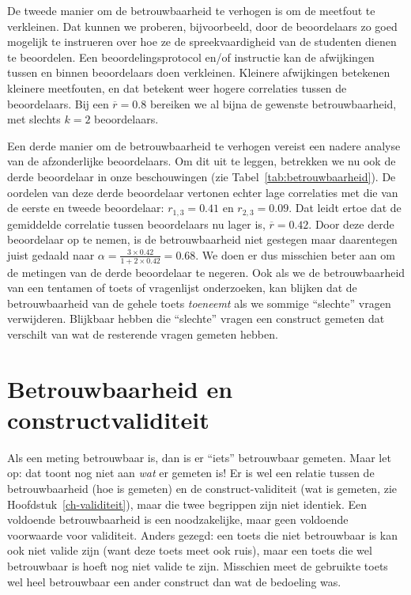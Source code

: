 \documentclass[
]{book}
\begin{document}
De tweede manier om de betrouwbaarheid te verhogen is om de meetfout te
verkleinen. Dat kunnen we proberen, bijvoorbeeld, door de beoordelaars
zo goed mogelijk te instrueren over hoe ze de spreekvaardigheid van de
studenten dienen te beoordelen. Een beoordelingsprotocol en/of
instructie kan de afwijkingen tussen en binnen beoordelaars doen
verkleinen. Kleinere afwijkingen betekenen kleinere meetfouten, en dat
betekent weer hogere correlaties tussen de beoordelaars. Bij een
\(\overline{r}=0.8\) bereiken we al bijna de gewenste betrouwbaarheid, met
slechts \(k=2\) beoordelaars.

Een derde manier om de betrouwbaarheid te verhogen vereist een nadere
analyse van de afzonderlijke beoordelaars. Om dit uit te leggen,
betrekken we nu ook de derde beoordelaar in onze beschouwingen (zie
Tabel~\ref{tab:betrouwbaarheid}). De oordelen van deze derde
beoordelaar vertonen echter lage correlaties met die van de eerste en
tweede beoordelaar: \(r_{1,3}=0.41\) en \(r_{2,3}=0.09\). Dat leidt ertoe
dat de gemiddelde correlatie tussen beoordelaars nu lager is,
\(\overline{r}=0.42\). Door deze derde beoordelaar op te nemen, is de
betrouwbaarheid niet gestegen maar daarentegen juist gedaald naar
\(\alpha = \frac{3\times0.42}{1+2\times0.42} = 0.68\). We doen er dus
misschien beter aan om de metingen van de derde beoordelaar te negeren.
Ook als we de betrouwbaarheid van een tentamen of toets of vragenlijst
onderzoeken, kan blijken dat de betrouwbaarheid van de gehele toets
\emph{toeneemt} als we sommige ``slechte'' vragen verwijderen. Blijkbaar hebben
die ``slechte'' vragen een construct gemeten dat verschilt van wat de
resterende vragen gemeten hebben.

\section{Betrouwbaarheid en constructvaliditeit}\label{betrouwbaarheid-en-constructvaliditeit}

Als een meting betrouwbaar is, dan is er ``iets'' betrouwbaar gemeten.
Maar let op: dat toont nog niet aan \emph{wat} er gemeten is! Er is wel een
relatie tussen de betrouwbaarheid (hoe is gemeten) en de
construct-validiteit (wat is gemeten, zie
Hoofdstuk~\ref{ch-validiteit}), maar die twee begrippen zijn niet identiek.
Een voldoende betrouwbaarheid is een noodzakelijke, maar geen voldoende
voorwaarde voor validiteit. Anders gezegd: een toets die niet
betrouwbaar is kan ook niet valide zijn (want deze toets meet ook ruis),
maar een toets die wel betrouwbaar is hoeft nog niet valide te zijn.
Misschien meet de gebruikte toets wel heel betrouwbaar een ander
construct dan wat de bedoeling was.
\end{document}
